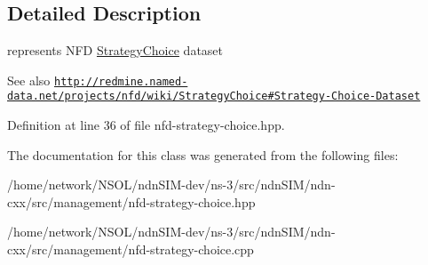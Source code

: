 \subsection{Detailed Description}
represents N\+FD \hyperlink{classndn_1_1nfd_1_1StrategyChoice}{Strategy\+Choice} dataset 

\begin{DoxySeeAlso}{See also}
\href{http://redmine.named-data.net/projects/nfd/wiki/StrategyChoice#Strategy-Choice-Dataset}{\tt http\+://redmine.\+named-\/data.\+net/projects/nfd/wiki/\+Strategy\+Choice\#\+Strategy-\/\+Choice-\/\+Dataset} 
\end{DoxySeeAlso}


Definition at line 36 of file nfd-\/strategy-\/choice.\+hpp.



The documentation for this class was generated from the following files\+:\begin{DoxyCompactItemize}
\item 
/home/network/\+N\+S\+O\+L/ndn\+S\+I\+M-\/dev/ns-\/3/src/ndn\+S\+I\+M/ndn-\/cxx/src/management/nfd-\/strategy-\/choice.\+hpp\item 
/home/network/\+N\+S\+O\+L/ndn\+S\+I\+M-\/dev/ns-\/3/src/ndn\+S\+I\+M/ndn-\/cxx/src/management/nfd-\/strategy-\/choice.\+cpp\end{DoxyCompactItemize}
